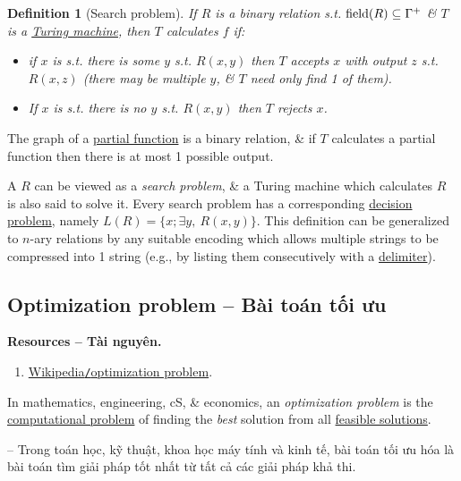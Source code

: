 \documentclass{article}
\newtheorem{definition}{Definition}
\begin{document}
\begin{definition}[Search problem]
	If $R$ is a binary relation s.t. ${\rm field}(R)\subseteq\Gamma^+$ \& $T$ is a \href{https://en.wikipedia.org/wiki/Turing_machine}{Turing machine}, then $T$ calculates $f$ if:
	\begin{itemize}
		\item if $x$ is s.t. there is some $y$ s.t. $R(x,y)$ then $T$ accepts $x$ with output $z$ s.t. $R(x,z)$ (there may be multiple $y$, \& $T$ need only find 1 of them).
		\item If $x$ is s.t. there is no $y$ s.t. $R(x,y)$ then $T$ rejects $x$.
	\end{itemize}
\end{definition}
The graph of a \href{https://en.wikipedia.org/wiki/Partial_function}{partial function} is a binary relation, \& if $T$ calculates a partial function then there is at most 1 possible output.

A $R$ can be viewed as a {\it search problem}, \& a Turing machine which calculates $R$ is also said to solve it. Every search problem has a corresponding \href{https://en.wikipedia.org/wiki/Decision_problem}{decision problem}, namely $L(R) = \{x;\exists y,\ R(x,y)\}$. This definition can be generalized to $n$-ary relations by any suitable encoding which allows multiple strings to be compressed into 1 string (e.g., by listing them consecutively with a \href{https://en.wikipedia.org/wiki/Delimiter}{delimiter}).


\subsection{Optimization problem -- Bài toán tối ưu}
\textbf{\textsf{Resources -- Tài nguyên.}}
\begin{enumerate}
	\item \href{https://en.wikipedia.org/wiki/Optimization_problem}{Wikipedia{\tt/}optimization problem}.
\end{enumerate}
In mathematics, engineering, cS, \& economics, an {\it optimization problem} is the \href{https://en.wikipedia.org/wiki/Computational_problem}{computational problem} of finding the {\it best} solution from all \href{https://en.wikipedia.org/wiki/Feasible_solution}{feasible solutions}.

-- Trong toán học, kỹ thuật, khoa học máy tính và kinh tế, bài toán tối ưu hóa là bài toán tìm giải pháp tốt nhất từ tất cả các giải pháp khả thi.
\end{document}
